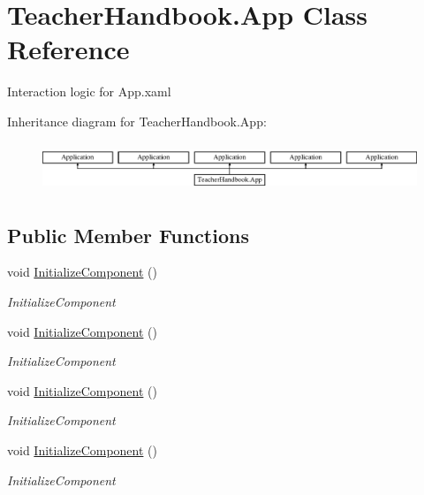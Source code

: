 \hypertarget{class_teacher_handbook_1_1_app}{}\section{Teacher\+Handbook.\+App Class Reference}
\label{class_teacher_handbook_1_1_app}


Interaction logic for App.\+xaml  


Inheritance diagram for Teacher\+Handbook.\+App\+:\begin{figure}[H]
\begin{center}
\leavevmode
\includegraphics[height=1.483444cm]{d2/d56/class_teacher_handbook_1_1_app}
\end{center}
\end{figure}
\subsection*{Public Member Functions}
\begin{DoxyCompactItemize}
\item 
void \mbox{\hyperlink{class_teacher_handbook_1_1_app_afbffdf9e50df5c19ff2ea81241e322b2}{Initialize\+Component}} ()
\begin{DoxyCompactList}\small\item\em Initialize\+Component \end{DoxyCompactList}\item 
void \mbox{\hyperlink{class_teacher_handbook_1_1_app_afbffdf9e50df5c19ff2ea81241e322b2}{Initialize\+Component}} ()
\begin{DoxyCompactList}\small\item\em Initialize\+Component \end{DoxyCompactList}\item 
void \mbox{\hyperlink{class_teacher_handbook_1_1_app_afbffdf9e50df5c19ff2ea81241e322b2}{Initialize\+Component}} ()
\begin{DoxyCompactList}\small\item\em Initialize\+Component \end{DoxyCompactList}\item 
void \mbox{\hyperlink{class_teacher_handbook_1_1_app_afbffdf9e50df5c19ff2ea81241e322b2}{Initialize\+Component}} ()
\begin{DoxyCompactList}\small\item\em Initialize\+Component \end{DoxyCompactList}\end{DoxyCompactItemize}
